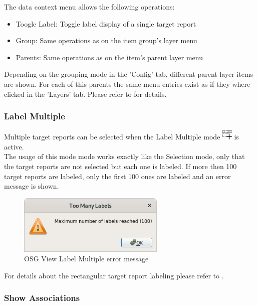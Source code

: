 The data context menu allows the following operations:

\begin{itemize}
 \item Toogle Label: Toggle label display of a single target report
 \item Group: Same operations as on the item group's layer menu
 \item Parents: Same operations as on the item's parent layer menu
\end{itemize}

Depending on the grouping mode in the 'Config' tab, different parent layer items are shown. For each of this parents the same menu entries exist as if they where clicked in the 'Layers' tab. Please refer to  for details.

\subsubsection{Label Multiple}

Multiple target reports can be selected when the Label Multiple mode \includegraphics[width=0.5cm,frame]{../../data/icons/label_multiple_action.png} is active. \\

The usage of this mode mode works exactly like the Selection mode, only that the target reports are not selected but each one is labeled. If more then 100 target reports are labeled, only the first 100 ones are labeled and an error message is shown.

\begin{figure}[H]
    \center
    \includegraphics[width=7cm]{../screenshots/osgview_label_multiple_error.png}
  \caption{OSG View Label Multiple error message}
\end{figure}

For details about the rectangular target report labeling please refer to .

\subsubsection{Show Associations}

